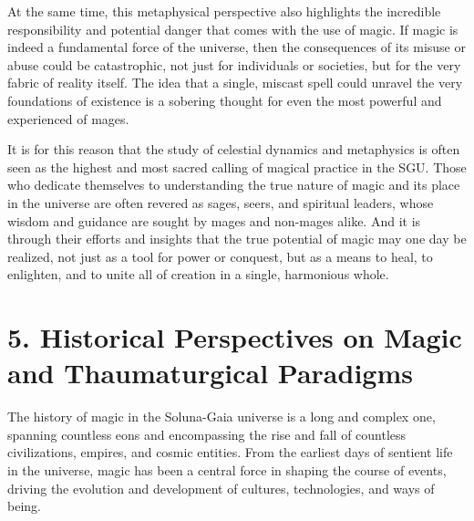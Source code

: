 \documentclass[12pt]{article}
\begin{document}
At the same time, this metaphysical perspective also highlights the incredible responsibility and potential danger that comes with the use of magic. If magic is indeed a fundamental force of the universe, then the consequences of its misuse or abuse could be catastrophic, not just for individuals or societies, but for the very fabric of reality itself. The idea that a single, miscast spell could unravel the very foundations of existence is a sobering thought for even the most powerful and experienced of mages.

It is for this reason that the study of celestial dynamics and metaphysics is often seen as the highest and most sacred calling of magical practice in the SGU. Those who dedicate themselves to understanding the true nature of magic and its place in the universe are often revered as sages, seers, and spiritual leaders, whose wisdom and guidance are sought by mages and non-mages alike. And it is through their efforts and insights that the true potential of magic may one day be realized, not just as a tool for power or conquest, but as a means to heal, to enlighten, and to unite all of creation in a single, harmonious whole.

\section{5. Historical Perspectives on Magic and Thaumaturgical Paradigms}

The history of magic in the Soluna-Gaia universe is a long and complex one, spanning countless eons and encompassing the rise and fall of countless civilizations, empires, and cosmic entities. From the earliest days of sentient life in the universe, magic has been a central force in shaping the course of events, driving the evolution and development of cultures, technologies, and ways of being.
\end{document}

